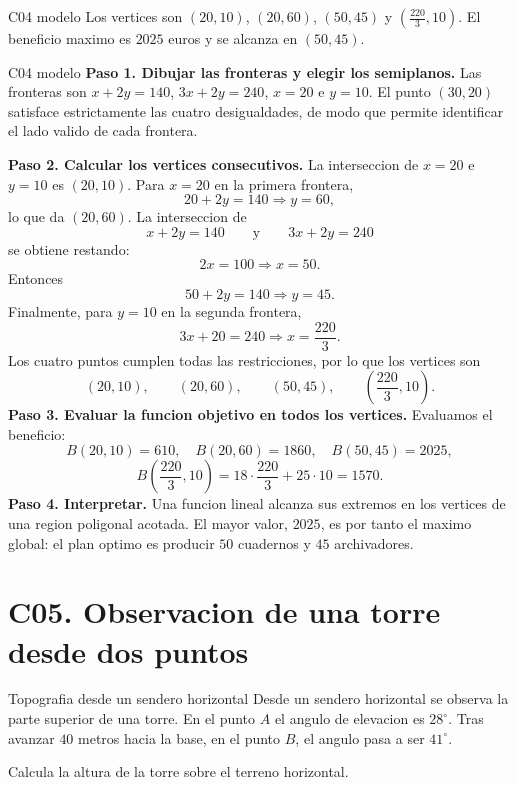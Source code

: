 \begin{shortanswer}{C04 modelo}
Los vertices son \((20,10)\), \((20,60)\), \((50,45)\) y
\(\left(\frac{220}{3},10\right)\). El beneficio maximo es \(2025\) euros y se alcanza en
\((50,45)\).
\end{shortanswer}

\begin{fullsolution}{C04 modelo}
\textbf{Paso 1. Dibujar las fronteras y elegir los semiplanos.}
Las fronteras son \(x+2y=140\), \(3x+2y=240\), \(x=20\) e \(y=10\). El punto
\((30,20)\) satisface estrictamente las cuatro desigualdades, de modo que permite identificar el lado valido
de cada frontera.

\textbf{Paso 2. Calcular los vertices consecutivos.}
La interseccion de \(x=20\) e \(y=10\) es \((20,10)\). Para \(x=20\) en la primera frontera,
\[
20+2y=140 \Longrightarrow y=60,
\]
lo que da \((20,60)\). La interseccion de
\[
x+2y=140
\qquad\text{y}\qquad
3x+2y=240
\]
se obtiene restando:
\[
2x=100 \Longrightarrow x=50.
\]
Entonces
\[
50+2y=140 \Longrightarrow y=45.
\]
Finalmente, para \(y=10\) en la segunda frontera,
\[
3x+20=240 \Longrightarrow x=\frac{220}{3}.
\]
Los cuatro puntos cumplen todas las restricciones, por lo que los vertices son
\[
(20,10),\qquad (20,60),\qquad (50,45),\qquad \left(\frac{220}{3},10\right).
\]
\textbf{Paso 3. Evaluar la funcion objetivo en todos los vertices.}
Evaluamos el beneficio:
\[
B(20,10)=610,
\quad
B(20,60)=1860,
\quad
B(50,45)=2025,
\]
\[
B\left(\frac{220}{3},10\right)=18\cdot \frac{220}{3}+25\cdot 10=1570.
\]
\textbf{Paso 4. Interpretar.} Una funcion lineal alcanza sus extremos en los vertices de una
region poligonal acotada. El mayor valor, \(2025\), es por tanto el maximo global: el plan
optimo es producir \(50\) cuadernos y \(45\) archivadores.
\end{fullsolution}

\section{C05. Observacion de una torre desde dos puntos}

\begin{contextproblem}{Topografia desde un sendero horizontal}
Desde un sendero horizontal se observa la parte superior de una torre. En el punto \(A\) el angulo
de elevacion es \(28^\circ\). Tras avanzar \(40\) metros hacia la base, en el punto \(B\), el
angulo pasa a ser \(41^\circ\).

Calcula la altura de la torre sobre el terreno horizontal.
\end{contextproblem}

